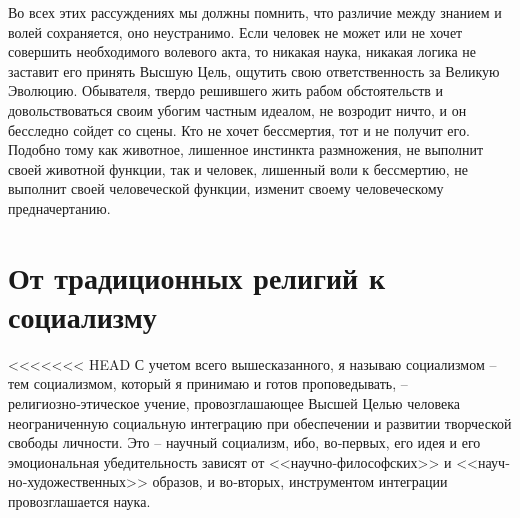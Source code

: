 \documentclass{book}
\begin{document}
Во всех этих рассуждениях мы должны помнить, что различие между знанием и волей сохраняется, оно неустранимо. Если человек не может или не хочет совершить необходимого волевого акта, то никакая наука, никакая логика не заставит его принять Высшую Цель, ощутить свою ответственность за Вели­кую Эволюцию. Обывателя, твердо решившего жить рабом об­стоятельств и довольствоваться своим убогим частным идеа­лом, не возродит ничто, и он бесследно сойдет со сцены. Кто не хочет бессмертия, тот и не получит его. Подобно тому как животное, лишенное инстинкта размножения, не выполнит сво­ей животной функции, так и человек, лишенный воли к бес­смертию, не выполнит своей человеческой функции, изменит своему человеческому предначертанию.


\section{От традиционных религий к социализму}

<<<<<<< HEAD
С учетом всего вышесказанного, я называю социализмом -- тем социализмом, который я принимаю и готов проповеды­вать, -- религиозно‑этическое учение, провозглашающее Высшей Целью человека неограниченную социальную интеграцию при обеспечении и развитии творческой свободы личности. Это -- научный социализм, ибо, во‑первых, его идея и его эмоциональ­ная убедительность зависят от <<научно‑философских>> и <<науч­но‑художественных>> образов, и во‑вторых, инструментом ин­теграции провозглашается наука.
\end{document}
